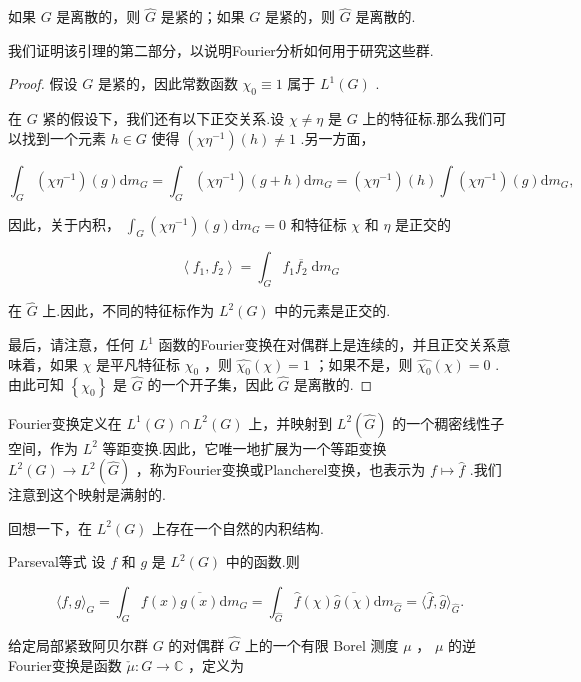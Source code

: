\documentclass[lang=cn,a4paper,11pt,openany,scheme=chinese]{elegantbook}
\makeatletter
\newcommand\setboxcounter[2]{\setcounter{tcb@cnt@#1}{#2}}
\makeatother
\begin{document}
\setboxcounter{lemma}{6}
\begin{lemma}{}
    如果 \(G\) 是离散的，则 \(\widehat{G}\) 是紧的；如果 \(G\) 是紧的，则 \(\widehat{G}\) 是离散的.
\end{lemma}

我们证明该引理的第二部分，以说明Fourier分析如何用于研究这些群.
\begin{proof}
    假设 \(G\) 是紧的，因此常数函数 \({\chi }_{0} \equiv  1\) 属于 \({L}^{1}\left( G\right)\) .

在 \(G\) 紧的假设下，我们还有以下正交关系.设 \(\chi  \neq  \eta\) 是 \(G\) 上的特征标.那么我们可以找到一个元素 \(h \in  G\) 使得 \(\left( {\chi {\eta }^{-1}}\right) \left( h\right)  \neq  1\) .另一方面，

\[
{\int }_{G}\left( {\chi {\eta }^{-1}}\right) \left( g\right) \mathrm{d}{m}_{G} = {\int }_{G}\left( {\chi {\eta }^{-1}}\right) \left( {g + h}\right) \mathrm{d}{m}_{G} = \left( {\chi {\eta }^{-1}}\right) \left( h\right) \int \left( {\chi {\eta }^{-1}}\right) \left( g\right) \mathrm{d}{m}_{G},
\]

因此，关于内积， \({\int }_{G}\left( {\chi {\eta }^{-1}}\right) \left( g\right) \mathrm{d}{m}_{G} = 0\) 和特征标 \(\chi\) 和 \(\eta\) 是正交的

\[
\left\langle  {{f}_{1},{f}_{2}}\right\rangle   = {\int }_{G}{f}_{1}\overline{{f}_{2}}\mathrm{\;d}{m}_{G}
\]

在 \(\widehat{G}\) 上.因此，不同的特征标作为 \({L}^{2}\left( G\right)\) 中的元素是正交的.

最后，请注意，任何 \({L}^{1}\) 函数的Fourier变换在对偶群上是连续的，并且正交关系意味着，如果 \(\chi\) 是平凡特征标 \({\chi }_{0}\) ，则 \(\widehat{{\chi }_{0}}\left( \chi \right)  = 1\) ；如果不是，则 \(\widehat{{\chi }_{0}}\left( \chi \right)  = 0\) .由此可知 \(\left\{  {\chi }_{0}\right\}\) 是 \(\widehat{G}\) 的一个开子集，因此 \(\widehat{G}\) 是离散的.
\end{proof}

Fourier变换定义在 \({L}^{1}\left( G\right)  \cap  {L}^{2}\left( G\right)\) 上，并映射到 \({L}^{2}\left( \widehat{G}\right)\) 的一个稠密线性子空间，作为 \({L}^{2}\) 等距变换.因此，它唯一地扩展为一个等距变换 \({L}^{2}\left( G\right)  \rightarrow  {L}^{2}\left( \widehat{G}\right)\) ，称为Fourier变换或Plancherel变换，也表示为 \(f \mapsto  \widehat{f}\) .我们注意到这个映射是满射的.

回想一下，在 \({L}^{2}\left( G\right)\) 上存在一个自然的内积结构.

\setboxcounter{theorem}{7}
\begin{theorem}{Parseval等式}
    设 \(f\) 和 \(g\) 是 \({L}^{2}\left( G\right)\) 中的函数.则

\[
\langle f,g{\rangle }_{G} = {\int }_{G}f\left( x\right) \overline{g\left( x\right) }\mathrm{d}{m}_{G} = {\int }_{\widehat{G}}\widehat{f}\left( \chi \right) \overline{\widehat{g}\left( \chi \right) }\mathrm{d}{m}_{\widehat{G}} = \langle \widehat{f},\widehat{g}{\rangle }_{\widehat{G}}.
\]

\end{theorem}
给定局部紧致阿贝尔群 \(G\) 的对偶群 \(\widehat{G}\) 上的一个有限 Borel 测度 \(\mu\) ， \(\mu\) 的逆Fourier变换是函数 \(\check{\mu } : G \rightarrow  \mathbb{C}\) ，定义为
\end{document}
